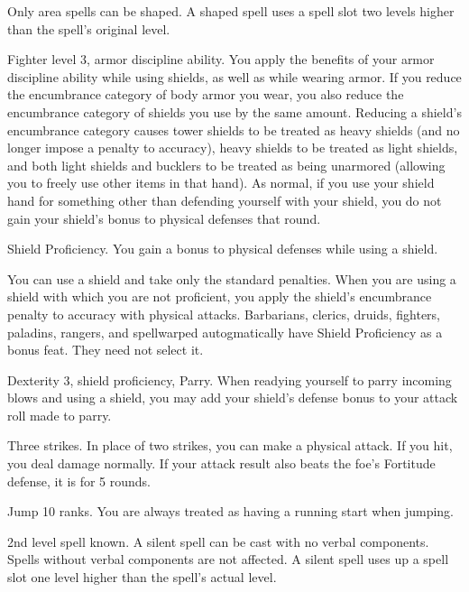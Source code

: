 Only area spells can be shaped.
A shaped spell uses a spell slot two levels higher than the spell's original level.

\featpres Fighter level 3, armor discipline ability.
\featben You apply the benefits of your armor discipline ability while using shields, as well as while wearing armor.
If you reduce the encumbrance category of body armor you wear, you also reduce the encumbrance category of shields you use by the same amount.
Reducing a shield's encumbrance category causes tower shields to be treated as heavy shields (and no longer impose a  penalty to accuracy), heavy shields to be treated as light shields, and both light shields and bucklers to be treated as being unarmored (allowing you to freely use other items in that hand).
As normal, if you use your shield hand for something other than defending yourself with your shield, you do not gain your shield's bonus to physical defenses that round.

\featpre Shield Proficiency.
\featben You gain a  bonus to physical defenses while using a shield.

\featben You can use a shield and take only the standard penalties.
When you are using a shield with which you are not proficient, you apply the shield's encumbrance penalty to accuracy with physical attacks.
Barbarians, clerics, druids, fighters, paladins, rangers, and spellwarped autogmatically have Shield Proficiency as a bonus feat.
They need not select it.

\featpres Dexterity 3, shield proficiency, Parry.
\featben When readying yourself to parry incoming blows and using a shield, you may add your shield's defense bonus to your attack roll made to parry.

\featpre Three strikes.
\featben In place of two strikes, you can make a physical attack.
If you hit, you deal damage normally.
If your attack result also beats the foe's Fortitude defense, it is \staggered for 5 rounds.

\featpre Jump 10 ranks.
\featben You are always treated as having a running start when jumping.

\featpre 2nd level spell known.
\featben A silent spell can be cast with no verbal components.
Spells without verbal components are not affected.
A silent spell uses up a spell slot one level higher than the spell's actual level.

